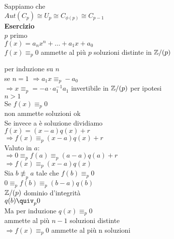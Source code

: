 \documentclass[12px]{article}
\begin{document}
{   Sappiamo che\\
   $Aut(C_p)\cong U_p\cong C_{\phi(p)}\cong C_{p-1}$\\
   \textbf{Esercizio}\\
   $p$ primo\\
   $f(x) = a_nx^n + \ldots + a_1x + a_0$\\
   $f(x)\equiv_p 0$ ammette al più $p$ soluzioni distinte in  $\mathbb{Z} / (p)$\\
   \begin{dimo}
   	per induzione su $n$ \\
	se $n = 1$  $ \Rightarrow a_1x\equiv_p -a_0$ \\
	$ \Rightarrow x \equiv_p = -a\cdot a_1^{-1}$\hfill $a_1$ invertibile in $\mathbb{Z}/(p)$ per ipotesi \\
	$n > 1$ \\
	Se $f(x) \equiv_p 0$\\
	non ammette soluzioni ok \\
	Se invece a è soluzione dividiamo\\
	$f(x) = (x - a ) q(x) + r$\\
	 $ \Rightarrow f(x)\equiv_p (x-a)q(x) + r$ \\
	 Valuto in $a$:\\
	 $ \Rightarrow 0\equiv_p f(a) \equiv_p (a-a)q(a) + r$ \\
	 $ \Rightarrow f(x) \equiv_p (x - a)q(x)$\\
	 Sia  $b\not \equiv_p a$ tale che  $f(b)\equiv_p 0$\\
	  $0\equiv_p f(b) \equiv_p (b-a)q(b)$\\
	  $\mathbb{Z}/(p)$ dominio d'integrità\\
	  $q(b)\quiv_p 0$\\
	  Ma per induzione  $q(x)\equiv_p 0$\\
	  ammette al più  $n-1$ soluzioni distinte\\
	  $ \Rightarrow  f(x)\equiv_p 0$ ammette al più n soluzioni 

   \end{dimo}
}
\end{document}

